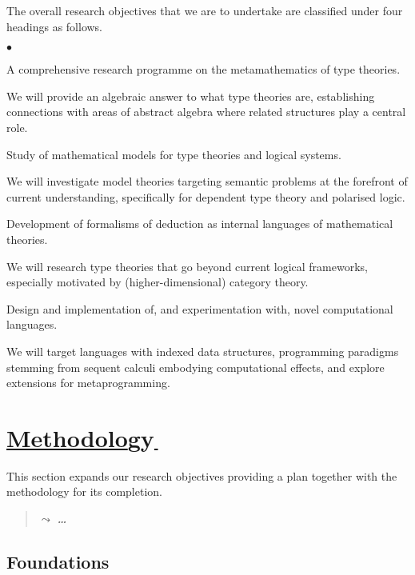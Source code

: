 \documentclass[11pt,twocolumn]{article}
\newenvironment{myitemize}
  {\begin{list}{$\bullet$}
  {\setlength{\topsep}{2pt}
   \setlength{\partopsep}{2pt}
   \setlength{\itemsep}{2.5pt}
   \setlength{\parsep}{2.5pt}
   \setlength{\leftmargin}{1em}
   \setlength{\labelwidth}{.5em}}}
  {\end{list}}
\newcommand{\note}[1]%
{\begin{quote}{\color{blue}$\leadsto$ \bf\em #1}\end{quote}}
\begin{document}
The overall research objectives that we are to undertake are classified
under four headings as follows.
\begin{myitemize}
\item[{\bfseries 1\enspace Foundations:}]\mbox{}\enspace\thinspace 
  A comprehensive research programme on the metamathematics of type theories.

  We will provide an algebraic answer to what type theories are, establishing
  connections with areas of abstract algebra where related structures play a
  central role.

\item[{\bfseries 2\enspace Models:}]\mbox{}\enspace\thinspace
  Study %
  of mathematical models for type theories and logical systems. 

  We will investigate model theories targeting semantic problems at the
  forefront of current understanding, specifically for dependent type theory
  and polarised logic.
  
\item[{\bfseries 3\enspace Calculi:}]\mbox{}\enspace\thinspace
  Development of formalisms of deduction as internal languages of mathematical
  theories.
  
  We will research type theories that go beyond current logical
  frameworks, especially motivated by (higher-dimensional) category theory.
  
\item[{\bfseries 4\enspace Programming:}]\mbox{}\enspace\thinspace
  Design and implementation of, and experimentation with, novel computational
  languages.  
  
  We will target languages with indexed data structures, programming paradigms
  stemming from sequent calculi embodying computational effects, and explore
  extensions for metaprogramming.
\end{myitemize}

\section{\underline{Methodolo}gy\hspace{-1mm}\underline{\,}}
\label{MethodologySection}

This section expands our research objectives providing a plan together
with the methodology for its completion.

\note{\ldots}

\subsection{Foundations}
\label{Foundations}
\end{document}
